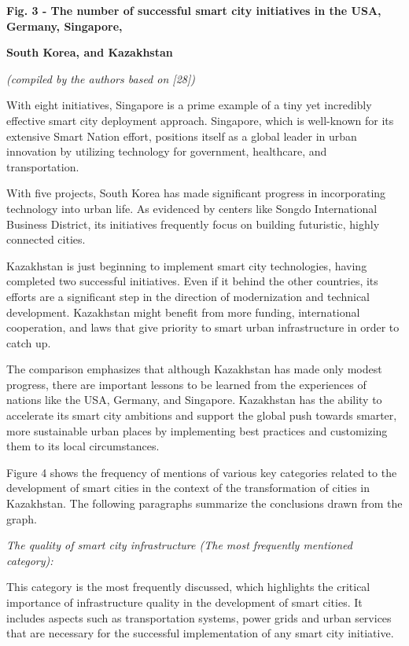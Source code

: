{{\bfseries Fig. 3 - The number of successful smart city initiatives in the
USA, Germany, Singapore,}

{\bfseries South Korea, and Kazakhstan}

\emph{(compiled by the authors based on {[}28{]})}

With eight initiatives, Singapore is a prime example of a tiny yet
incredibly effective smart city deployment approach. Singapore, which is
well-known for its extensive Smart Nation effort, positions itself as a
global leader in urban innovation by utilizing technology for
government, healthcare, and transportation.

With five projects, South Korea has made significant progress in
incorporating technology into urban life. As evidenced by centers like
Songdo International Business District, its initiatives frequently focus
on building futuristic, highly connected cities.

Kazakhstan is just beginning to implement smart city technologies,
having completed two successful initiatives. Even if it behind the other
countries, its efforts are a significant step in the direction of
modernization and technical development. Kazakhstan might benefit from
more funding, international cooperation, and laws that give priority to
smart urban infrastructure in order to catch up.

The comparison emphasizes that although Kazakhstan has made only modest
progress, there are important lessons to be learned from the experiences
of nations like the USA, Germany, and Singapore. Kazakhstan has the
ability to accelerate its smart city ambitions and support the global
push towards smarter, more sustainable urban places by implementing best
practices and customizing them to its local circumstances.

Figure 4 shows the frequency of mentions of various key categories
related to the development of smart cities in the context of the
transformation of cities in Kazakhstan. The following paragraphs
summarize the conclusions drawn from the graph.

\emph{The quality of smart city infrastructure (The most frequently
mentioned category):}

This category is the most frequently discussed, which highlights the
critical importance of infrastructure quality in the development of
smart cities. It includes aspects such as transportation systems, power
grids and urban services that are necessary for the successful
implementation of any smart city initiative.

}
